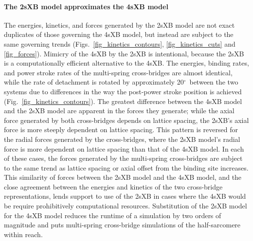 \documentclass[11pt,titlepage]{article}
\newcommand{\de}{$^\circ$~} %
\begin{document}
\paragraph*{The 2sXB model approximates the 4sXB model} %
The energies, kinetics, and forces generated by the 2sXB model are not exact duplicates of those governing the 4sXB model, but instead are subject to the same governing trends (Figs.~\ref{fig_kinetics_contours}, \ref{fig_kinetics_cuts} and \ref{fig_forces}). 
Mimicry of the 4sXB by the 2sXB is intentional, because the 2sXB is a computationally efficient alternative to the 4sXB\@.  
The energies, binding rates, and power stroke rates of the multi-spring cross-bridges are almost identical, while the rate of detachment is rotated by approximately 20\de between the two systems due to differences in the way the post-power stroke position is achieved (Fig.~\ref{fig_kinetics_contours}).
The greatest difference between the 4sXB model and the 2sXB model are apparent in the forces they generate; while the axial force generated by both cross-bridges depends on lattice spacing, the 2sXB's axial force is more steeply dependent on lattice spacing. 
This pattern is reversed for the radial forces generated by the cross-bridges, where the 2sXB model's radial force is more dependent on lattice spacing than that of the 4sXB model.  
In each of these cases, the forces generated by the multi-spring cross-bridges are subject to the same trend as lattice spacing or axial offset from the binding site increases.
This similarity of forces between the 2sXB model and the 4sXB model, and the close agreement between the energies and kinetics of the two cross-bridge representations, lends support to use of the 2sXB in cases where the 4sXB would be require prohibitively computational resources.
Substitution of the 2sXB model for the 4sXB model reduces the runtime of a simulation by two orders of magnitude and puts multi-spring cross-bridge simulations of the half-sarcomere within reach.
\end{document}
